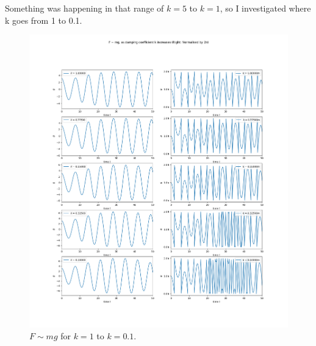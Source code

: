\documentclass[10pt, twocolumn]{article}
\begin{document}
Something was happening in that range of $k = 5$ to $k = 1$, so I investigated where k goes from 1 to 0.1.
\begin{figure}[H]
    \centering
    \includegraphics[width = \columnwidth]{Projects/ForcedSimplePendulum/Plots/F~mg as damping coefficient k increases from 1 to 0.1.png}
    \caption{$F \sim{mg}$ for $k = 1$ to $k = 0.1$.}
    \label{k 1 to 0.1}
\end{figure}
\end{document}
